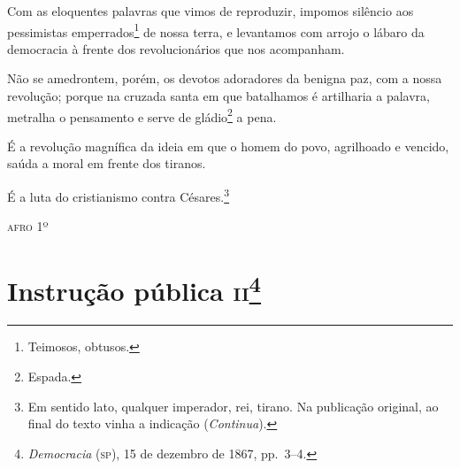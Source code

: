 Com as eloquentes palavras que vimos de reproduzir, impomos silêncio aos
pessimistas emperrados\footnote{Teimosos, obtusos.} de nossa terra, e
levantamos com arrojo o lábaro da democracia à frente dos
revolucionários que nos acompanham.

Não se amedrontem, porém, os devotos adoradores da benigna paz, com a
nossa revolução; porque na cruzada santa em que batalhamos é artilharia
a palavra, metralha o pensamento e serve de gládio\footnote{Espada.} a
pena.

É a revolução magnífica da ideia em que o homem do povo, agrilhoado e
vencido, saúda a moral em frente dos tiranos.

É a luta do cristianismo contra Césares.\footnote{Em sentido lato,
  qualquer imperador, rei, tirano. Na publicação original, ao final do texto vinha a indicação (\emph{Continua}).}



\begin{flushright}
\textsc{afro} 1º
\end{flushright}

\chapter{Instrução pública \textsc{ii}\footnote{\emph{Democracia} (\textsc{sp}),
  15 de dezembro de 1867, pp.~3--4.}} %

